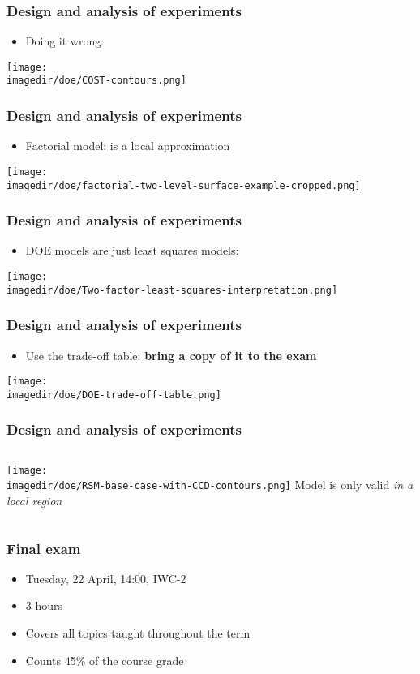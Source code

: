 \begin{frame}\frametitle{Design and analysis of experiments}
	\begin{itemize}
		\item	Doing it wrong:
	\end{itemize}

	\texttt{[image: \\imagedir/doe/COST-contours.png]}
\end{frame}

\begin{frame}\frametitle{Design and analysis of experiments}
	\begin{itemize}
		\item	Factorial model: is a local approximation
	\end{itemize}

	\texttt{[image: \\imagedir/doe/factorial-two-level-surface-example-cropped.png]}
\end{frame}

\begin{frame}\frametitle{Design and analysis of experiments}
	\begin{itemize}
		\item	DOE models are just least squares models:
	\end{itemize}

	\texttt{[image: \\imagedir/doe/Two-factor-least-squares-interpretation.png]}
\end{frame}

\begin{frame}\frametitle{Design and analysis of experiments}
	\begin{itemize}
		\item	Use the trade-off table: \textbf{bring a copy of it to the exam}
	\end{itemize}

	\texttt{[image: \\imagedir/doe/DOE-trade-off-table.png]}
\end{frame}

\begin{frame}\frametitle{Design and analysis of experiments}
	\begin{columns}
		\column{6cm}
			\texttt{[image: \\imagedir/doe/RSM-base-case-with-CCD-contours.png]}
		\column{4cm}
			Model is only valid \emph{in a local region}
	\end{columns}
\end{frame}

\begin{frame}\frametitle{Final exam}
	\begin{itemize}
		\item	Tuesday, 22 April, 14:00, IWC-2 {\color{myOrange}{(please confirm)}}
		\item	3 hours 
		\item	Covers all topics taught throughout the term
		\item	Counts 45\% of the course grade
	\end{itemize}
\end{frame}

